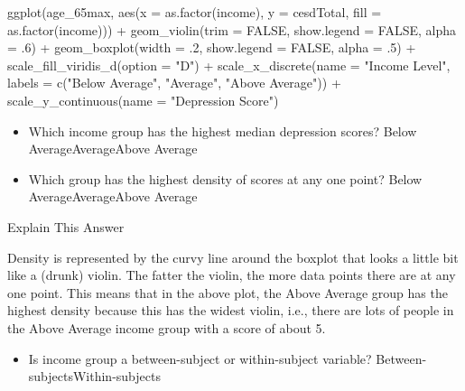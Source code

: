\documentclass[
  oneside]{book}
\newenvironment{Shaded}{\begin{snugshade}}{\end{snugshade}}
\newcommand{\AttributeTok}[1]{\textcolor[rgb]{0.77,0.63,0.00}{#1}}
\newcommand{\ConstantTok}[1]{\textcolor[rgb]{0.00,0.00,0.00}{#1}}
\newcommand{\DecValTok}[1]{\textcolor[rgb]{0.00,0.00,0.81}{#1}}
\newcommand{\FunctionTok}[1]{\textcolor[rgb]{0.00,0.00,0.00}{#1}}
\newcommand{\NormalTok}[1]{#1}
\newcommand{\SpecialCharTok}[1]{\textcolor[rgb]{0.00,0.00,0.00}{#1}}
\newcommand{\StringTok}[1]{\textcolor[rgb]{0.31,0.60,0.02}{#1}}
\providecommand{\tightlist}{%
  \setlength{\itemsep}{0pt}\setlength{\parskip}{0pt}}
\begin{document}
\begin{Shaded}
\begin{Highlighting}[]
\FunctionTok{ggplot}\NormalTok{(age\_65max, }\FunctionTok{aes}\NormalTok{(}\AttributeTok{x =} \FunctionTok{as.factor}\NormalTok{(income), }\AttributeTok{y =}\NormalTok{ cesdTotal, }\AttributeTok{fill =} \FunctionTok{as.factor}\NormalTok{(income))) }\SpecialCharTok{+}
  \FunctionTok{geom\_violin}\NormalTok{(}\AttributeTok{trim =} \ConstantTok{FALSE}\NormalTok{, }\AttributeTok{show.legend =} \ConstantTok{FALSE}\NormalTok{, }\AttributeTok{alpha =}\NormalTok{ .}\DecValTok{6}\NormalTok{) }\SpecialCharTok{+}
  \FunctionTok{geom\_boxplot}\NormalTok{(}\AttributeTok{width =}\NormalTok{ .}\DecValTok{2}\NormalTok{, }\AttributeTok{show.legend =} \ConstantTok{FALSE}\NormalTok{, }\AttributeTok{alpha =}\NormalTok{ .}\DecValTok{5}\NormalTok{) }\SpecialCharTok{+}
  \FunctionTok{scale\_fill\_viridis\_d}\NormalTok{(}\AttributeTok{option =} \StringTok{"D"}\NormalTok{) }\SpecialCharTok{+}
  \FunctionTok{scale\_x\_discrete}\NormalTok{(}\AttributeTok{name =} \StringTok{"Income Level"}\NormalTok{, }\AttributeTok{labels =} \FunctionTok{c}\NormalTok{(}\StringTok{"Below Average"}\NormalTok{, }\StringTok{"Average"}\NormalTok{, }\StringTok{"Above Average"}\NormalTok{)) }\SpecialCharTok{+}
  \FunctionTok{scale\_y\_continuous}\NormalTok{(}\AttributeTok{name =} \StringTok{"Depression Score"}\NormalTok{)}
\end{Highlighting}
\end{Shaded}

\begin{itemize}
\item
  Which income group has the highest median depression scores? Below AverageAverageAbove Average
\item
  Which group has the highest density of scores at any one point? Below AverageAverageAbove Average
\end{itemize}

Explain This Answer

Density is represented by the curvy line around the boxplot that looks a little bit like a (drunk) violin. The fatter the violin, the more data points there are at any one point. This means that in the above plot, the Above Average group has the highest density because this has the widest violin, i.e., there are lots of people in the Above Average income group with a score of about 5.

\begin{itemize}
\tightlist
\item
  Is income group a between-subject or within-subject variable? Between-subjectsWithin-subjects
\end{itemize}
\end{document}
